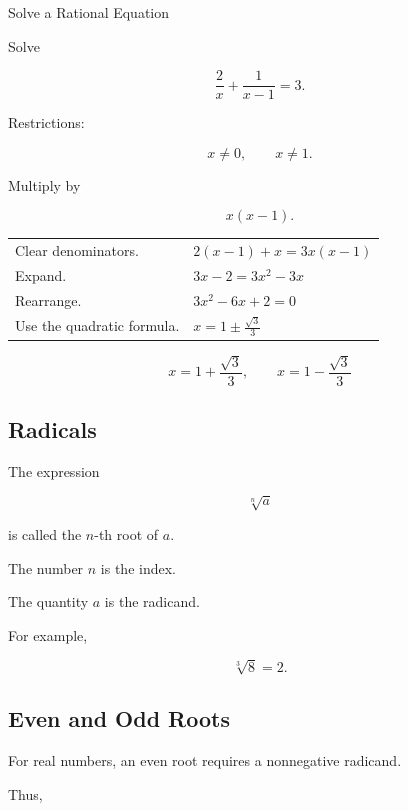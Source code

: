 \begin{workedexamplebox}{Solve a Rational Equation}

Solve

\[ \frac2x+\frac1{x-1}=3. \]

Restrictions:

\[ x\neq0,\qquad x\neq1. \]

Multiply by

\[ x(x-1). \]

\begin{tabularx}{\textwidth}{@{}>{\raggedright\arraybackslash}p{}X@{}}
Clear denominators. & \(2(x-1)+x=3x(x-1)\)\\
Expand. & \(3x-2=3x^2-3x\)\\
Rearrange. & \(3x^2-6x+2=0\)\\
Use the quadratic formula. & \(x=1\pm\frac{\sqrt3}{3}\)
\end{tabularx}

\begin{answerbox}
\[ x=1+\frac{\sqrt3}{3},\qquad x=1-\frac{\sqrt3}{3} \]
\end{answerbox}
\end{workedexamplebox}

\subsection{Radicals}
\label{subsec:radicals}

The expression

\[ \sqrt[n]{a} \]

is called the \(n\)-th root of \(a\).

The number \(n\) is the index.

The quantity \(a\) is the radicand.

For example,

\[ \sqrt[3]{8}=2. \]

\subsection{Even and Odd Roots}
\label{subsec:even-odd-roots}

For real numbers, an even root requires a nonnegative radicand.

Thus,

